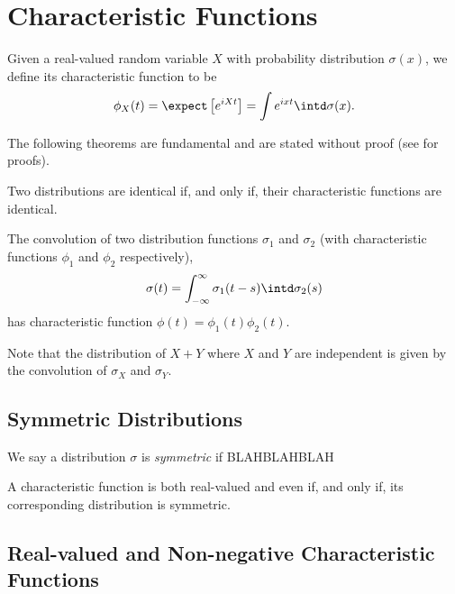 \chapter{Characteristic Functions}
\label{Ch:CharacteristicFunctions}



Given a real-valued random variable $X$ with probability distribution $\sigma(x)$, we define its characteristic function to be
\begin{equation}
	\phi_X(t) =  \expect\left[e^{iXt}\right] = \int e^{ixt} \intd \sigma(x).
\end{equation}

The following theorems are fundamental and are stated without proof (see \cite{Lukacs1970-qm} for proofs).
\begin{theorem}[Uniqueness]
	Two distributions are identical if, and only if, their characteristic functions are identical.
\end{theorem}
\begin{theorem}[Convolution]
	The convolution of two distribution functions $\sigma_1$ and $\sigma_2$ (with characteristic functions $\phi_1$ and $\phi_2$ respectively),
	$$\sigma(t) = \int_{-\infty}^{\infty} \sigma_1(t - s) \intd \sigma_2(s)$$
	has characteristic function $\phi(t) = \phi_1(t)\phi_2(t)$.
	\label{thm:convolution}
\end{theorem}
Note that the distribution of $X + Y$ where $X$ and $Y$ are independent is given by the convolution of $\sigma_X$ and $\sigma_Y$.


\section{Symmetric Distributions}
We say a distribution $\sigma$ is \emph{symmetric} if
BLAHBLAHBLAH
\begin{theorem}
	A characteristic function is both real-valued and even if, and only if, its corresponding distribution is symmetric.
	\label{thm:symmetricdistrealcf}
\end{theorem}
\section{Real-valued and Non-negative Characteristic Functions}


